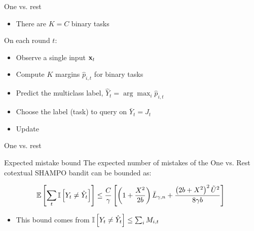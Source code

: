 \documentclass{beamer}
\begin{document}
\begin{frame}{One vs. rest}

\begin{itemize}
\item There are $K= C$ binary tasks\newline
\end{itemize}
On each round $t$:\newline
\begin{itemize}
\item Observe a single input $\mathbf{x}_{t}$ \newline
\item Compute $K$  margins $\hat{p}_{i,t}$ for binary tasks \newline
\item Predict the multiclass label, $\hat{Y}_t = \arg\max_i \hat{p}_{i,t}$\newline
\item Choose the label (task) to query on $\bar{Y}_t=J_t$ \newline
\item Update %
\end{itemize}
\end{frame}

\begin{frame}{One vs. rest}
\begin{block}{Expected mistake bound}
The  expected number of mistakes  of the One vs. Rest cotextual SHAMPO bandit  can be bounded as:

\begin{displaymath}
\mathbb{E}\left[{\sum_t \mathbb{I}\left[{Y_t \neq \hat{Y}_t}\right]}\right]\le \frac{C}{\gamma}\left[{\left({1+\frac{X^2}{2b} }\right){\bar L}_{\gamma,n}+\frac{\left({{2b+X^2}}\right)^2\tilde{U}^2}{8{\gamma}b}}\right]~
\end{displaymath}
\end{block}

\begin{itemize}
\item This bound comes from $\mathbb{I}\left[{Y_t \neq \hat{Y}_t}\right]\le \sum_iM_{i,t}$\newline

\end{itemize}
\end{frame}
\end{document}
